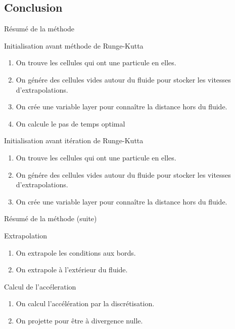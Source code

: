 \subsection{Conclusion}
\begin{frame}{Résumé de la méthode}
 \begin{block}{Initialisation avant méthode de Runge-Kutta}
  \begin{enumerate}
   \item On trouve les cellules qui ont une particule en elles.
   \item On génére des cellules vides autour du fluide pour stocker les vitesses d'extrapolations.
   \item On crée une variable layer pour connaître la distance hors du fluide.
   \item On calcule le pas de temps optimal
  \end{enumerate}

 \end{block}

  \begin{block}{Initialisation avant itération de Runge-Kutta}
  \begin{enumerate}
   \item On trouve les cellules qui ont une particule en elles.
   \item On génére des cellules vides autour du fluide pour stocker les vitesses d'extrapolations.
   \item On crée une variable layer pour connaître la distance hors du fluide.
  \end{enumerate}

 \end{block}

 
\end{frame}

\begin{frame}{Résumé de la méthode (suite)}
 \begin{block}{Extrapolation}
  \begin{enumerate}
   \item On extrapole les conditions aux bords.
   \item On extrapole à l'extérieur du fluide.
  \end{enumerate}

 \end{block}
 \begin{block}{Calcul de l'accéleration}
  \begin{enumerate}
   \item On calcul l'accélération par la discrétisation.
   \item On projette pour être à divergence nulle.
  \end{enumerate}

 \end{block}


\end{frame}


